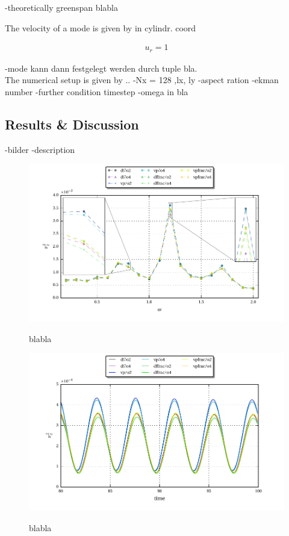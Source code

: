 -theoretically greenspan  blabla

The velocity of a mode is given by in cylindr. coord

\begin{align}
    u_r =  1
\end{align}


-mode kann dann festgelegt werden durch tuple bla.\\
The numerical setup is  given by ..
-Nx  = 128 ,lx, ly
-aspect ration
-ekman number
-further condition timestep
-omega in bla
\newpage

\subsection{Results \& Discussion}

-bilder
-description


\begin{figure}[!pt]
  \centering
  \includegraphics{gfx/cone/cylinder/cylinder.pdf}\label{fig:cone:cyl}
  \caption{blabla}

  \includegraphics{gfx/cone/cylinder/cyl_vz.pdf}\label{fig:cone:cyl_time}
  \caption{blabla}
\end{figure}
\newpage

